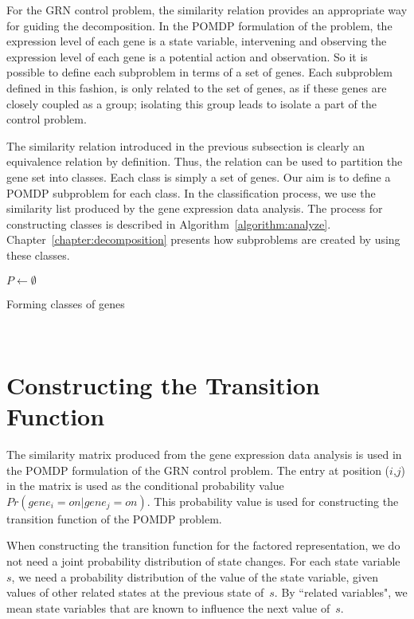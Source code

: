 For the GRN control problem, the similarity relation provides an appropriate way for guiding the
decomposition. In the POMDP formulation of the problem, the expression level of each gene is a state
variable, intervening and observing the expression level of each gene is a potential action and observation.
So it is possible to define each subproblem in terms of a set of genes. Each subproblem defined in this
fashion, is only related to the set of genes, as if these genes are closely coupled as a group; isolating
this group leads to isolate a part of the control problem.

The similarity relation introduced in the previous subsection is clearly an equivalence relation by
definition. Thus, the relation can be used to partition the gene set into classes. Each class is simply a set
of genes. Our aim is to define a POMDP subproblem for each class. In the classification process, we use the
similarity list produced by the gene expression data analysis. The process for constructing classes is
described in Algorithm~\ref{algorithm:analyze}. Chapter~\ref{chapter:decomposition} presents how subproblems are
created by using these classes.

{\small
\begin{algorithm} \dontprintsemicolon {}
 $P \longleftarrow \emptyset$  \caption{Forming classes of genes}~\label{algorithm:analyze}
\end{algorithm}
}

\section{Constructing the Transition Function}
\label{section:transitionf} The similarity matrix produced from the gene expression data analysis is used in
the POMDP formulation of the GRN control problem. The entry at position ($i$,$j$) in the matrix is used as
the conditional probability value $Pr(gene_i = on | gene_j = on)$. This probability value is used for
constructing the transition function of the POMDP problem.

When constructing the transition function for the factored representation, we do not need a joint probability
distribution of state changes.  For each state variable~$s$, we need a probability distribution of the value
of the state variable, given values of other related states at the previous state of~$s$. By ``related
variables", we mean state variables that are known to influence the next value of~$s$.

